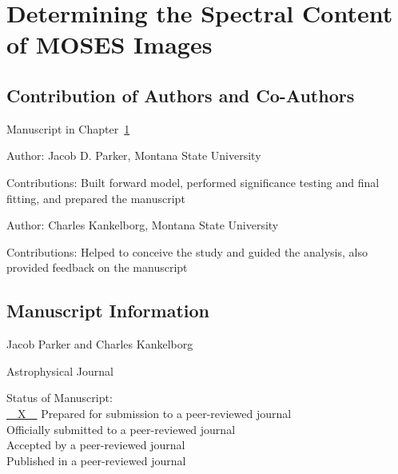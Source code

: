
\chapter{Determining the Spectral Content of MOSES Images}\label{CH:manuscript2}

\section{Contribution of Authors and Co-Authors}

Manuscript in Chapter~\ref{CH:manuscript2}  %

Author: Jacob D. Parker, Montana State University

\begin{singlespace}
	Contributions: Built forward model, performed significance testing and final fitting, and prepared the manuscript
\end{singlespace}

Author: Charles Kankelborg, Montana State University

\begin{singlespace}
	Contributions: Helped to conceive the study and guided the analysis, also provided feedback on the manuscript
\end{singlespace}


\newpage

\section{Manuscript Information}

Jacob Parker and Charles Kankelborg

Astrophysical Journal

\begin{singlespace}
  Status of Manuscript: \\\indent %
  \underline{~~X~~} Prepared for submission to a peer-reviewed journal\\\indent
  \underline{\phantom{~~X~~}} Officially submitted to a peer-reviewed journal\\\indent
  \underline{\phantom{~~X~~}} Accepted by a peer-reviewed journal\\\indent
  \underline{\phantom{~~X~~}} Published in a peer-reviewed journal
\end{singlespace}
\newpage



